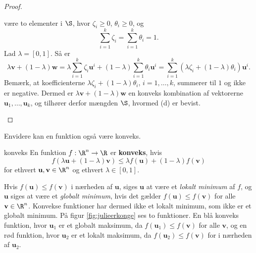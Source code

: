 \begin{proof}
\begin{enumerate}[label=(\alph*)]
%
være to elementer i $\S$, hvor $ \zeta_i \geq 0$, $ \theta_i \geq 0$, og $$ \sum_{i=1}^{k} \zeta_i = \sum_{i=1}^{k} \theta_i = 1.$$ 
Lad $ \lambda = [0,1].$
Så er $$\lambda \textbf{v} + (1 - \lambda ) \textbf{w} = \lambda \sum_{i=1}^k \zeta_i \textbf{u}^i + (1 - \lambda) \sum_{i=1}^k \theta_i \textbf{u}^i = \sum_{i=1}^k (\lambda \zeta_i + (1-\lambda )\theta_i ) \textbf{u}^i.$$
Bemærk, at koefficienterne $ \lambda \zeta_i + (1 - \lambda) \theta_i$, $i = 1, \ldots, k$, summerer til $1$ og ikke er negative. 
Dermed er $ \lambda \textbf{v} + (1 - \lambda ) \textbf{w}$ en konveks kombination af vektorerne $\textbf{u}_1, \ldots, \textbf{u}_k$, og tilhører derfor mængden $\S$, hvormed (d) er bevist. 
\end{enumerate}
\end{proof}
% 
Envidere kan en funktion også være konveks.
\begin{defn}{}{konveks}
En funktion $f: \R^n \rightarrow \R$ er \textbf{konveks}, hvis 
$$f(\lambda \textbf{u} + (1- \lambda ) \textbf{v}) \leq \lambda f( \textbf{u}) + (1- \lambda ) f(\textbf{v}) $$ 
for ethvert $\textbf{u}, \textbf{v} \in \R^n$ og ethvert $\lambda \in [0,1]$.
\end{defn}
\noindent
% 
Hvis $f(\mathbf{u}) \leq f(\mathbf{v})$ i nærheden af $\mathbf{u}$, siges $\mathbf{u}$ at være et \textit{lokalt minimum} af $f$, og $\mathbf{u}$ siges at være et \textit{globalt minimum}, hvis det gælder  $f(\mathbf{u}) \leq f(\mathbf{v})$ for alle $\mathbf{v} \in \R^n$.
Konvekse funktioner har dermed ikke et lokalt minimum, som ikke er et globalt minimum.
På figur \ref{fig:julieerkonge} ses to funktioner. 
En blå konveks funktion, hvor $\mathbf{u}_1$ er et globalt maksimum, da $f(\mathbf{u}_1) \leq f(\mathbf{v})$ for alle $\mathbf{v}$, 
og en rød funktion, hvor $\mathbf{u}_2$ er et lokalt maksimum, da $f(\mathbf{u}_2) \leq f(\mathbf{v})$ for i nærheden af $\mathbf{u}_2$. 
%

%